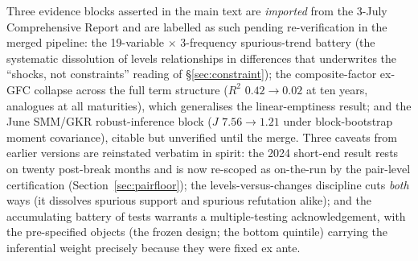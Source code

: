 \documentclass[11pt]{article}
\begin{document}
Three evidence blocks asserted in the main text are \emph{imported} from the 3-July Comprehensive Report and are labelled as such pending re-verification in the merged pipeline: the 19-variable $\times$ 3-frequency spurious-trend battery (the systematic dissolution of levels relationships in differences that underwrites the ``shocks, not constraints'' reading of \S\ref{sec:constraint}); the composite-factor ex-GFC collapse across the full term structure ($R^2$ $0.42\to0.02$ at ten years, analogues at all maturities), which generalises the linear-emptiness result; and the June SMM/GKR robust-inference block ($J$ $7.56\to1.21$ under block-bootstrap moment covariance), citable but unverified until the merge. Three caveats from earlier versions are reinstated verbatim in spirit: the 2024 short-end result rests on twenty post-break months and is now re-scoped as on-the-run by the pair-level certification (Section~\ref{sec:pairfloor}); the levels-versus-changes discipline cuts \emph{both} ways (it dissolves spurious support and spurious refutation alike); and the accumulating battery of tests warrants a multiple-testing acknowledgement, with the pre-specified objects (the frozen design; the bottom quintile) carrying the inferential weight precisely because they were fixed ex ante.
\end{document}
